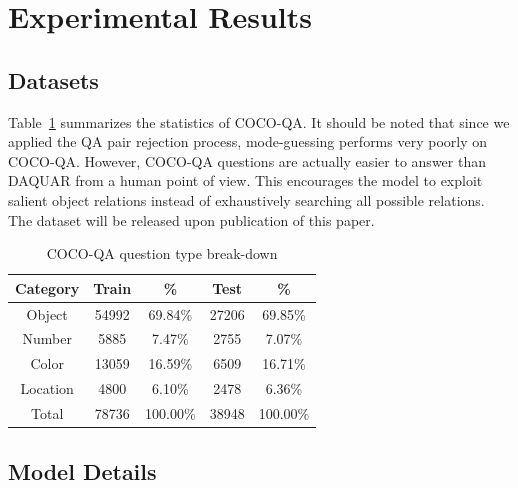 \documentclass{article} %
\renewcommand{\#}[1]{\textbf{#1}}
\begin{document}
\section{Experimental Results}

\subsection{Datasets}
Table~\ref{tab:dataset_category_stats} summarizes the statistics of 
COCO-QA. It should be noted that since we applied the QA pair rejection process, 
mode-guessing performs very poorly on COCO-QA. However, COCO-QA questions 
are actually easier to answer than DAQUAR from a human point of view. This encourages 
the model to exploit salient object relations instead of exhaustively searching
all possible relations. The dataset will be released upon publication of this paper.
\begin{table}
\caption{COCO-QA question type break-down}
\label{tab:dataset_category_stats}
\vskip 0.15in
\begin{center}
\begin{small}
\begin{sc}
\begin{tabular}{c c c c c}
\hline
Category & Train & \%       & Test  & \%       \\
\hline
Object   & 54992 & 69.84\%  & 27206 & 69.85\%  \\
Number   & 5885  & 7.47\%   & 2755  & 7.07\%   \\
Color    & 13059 & 16.59\%  & 6509  & 16.71\%  \\
Location & 4800  & 6.10\%   & 2478  & 6.36\%   \\
\hline
Total    & 78736 & 100.00\% & 38948 & 100.00\% \\
\hline
\end{tabular}
\end{sc}
\end{small}
\end{center}
\end{table}

\subsection{Model Details}
\end{document}
